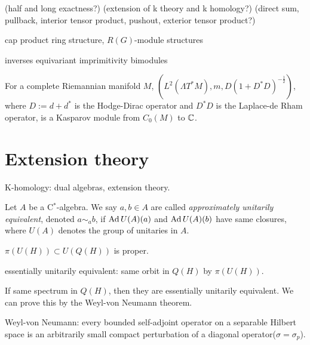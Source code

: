 \documentclass{../../large}
\begin{document}
\begin{prb}[Monoidality]
\end{prb}


\begin{prb}[$\K$-stability]
\end{prb}




(half and long exactness?)
(extension of k theory and k homology?)
(direct sum, pullback, interior tensor product, pushout, exterior tensor product?)

cap product
ring structure, $R(G)$-module structures




inverses
equivariant imprimitivity bimodules



\begin{prb}

For a complete Riemannian manifold $M$, $(L^2(\Lambda T^*M),m,D(1+D^*D)^{-\frac12})$, where $D:=d+d^*$ is the Hodge-Dirac operator and $D^*D$ is the Laplace-de Rham operator, is a Kasparov module from $C_0(M)$ to $\mathbb{C}$.
\end{prb}

\section{Extension theory}

K-homology: dual algebras, extension theory.



\begin{prb}
Let $A$ be a C$^*$-algebra.
We say $a,b\in A$ are called \emph{approximately unitarily equivalent}, denoted $a\sim_ab$, if $\operatorname{Ad} U(A)(a)$ and $\operatorname{Ad} U(A)(b)$ have same closures, where $U(A)$ denotes the group of unitaries in $A$.



$\pi(U(H))\subset U(Q(H))$ is proper.

essentially unitarily equivalent: same orbit in $Q(H)$ by $\pi(U(H))$.

If same spectrum in $Q(H)$, then they are essentially unitarily equivalent.
We can prove this by the Weyl-von Neumann theorem.

Weyl-von Neumann: every bounded self-adjoint operator on a separable Hilbert space is an arbitrarily small compact perturbation of a diagonal operator($\sigma=\sigma_p$).
\end{prb}
\end{document}
